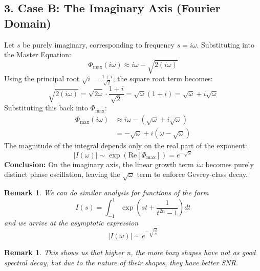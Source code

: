 \documentclass[11pt]{article}
\theoremstyle{breakdef}
\newtheorem{remark}[theorem]{Remark}
\begin{document}
\subsection*{3. Case B: The Imaginary Axis (Fourier Domain)}
Let $s$ be purely imaginary, corresponding to frequency $s = i\omega$. Substituting into the Master Equation:
\begin{equation}
    \Phi_{\text{max}}(i\omega) \approx i\omega - \sqrt{2(i\omega)}
\end{equation}
Using the principal root $\sqrt{i} = \frac{1+i}{\sqrt{2}}$, the square root term becomes:
\begin{equation}
    \sqrt{2(i\omega)} = \sqrt{2\omega} \cdot \frac{1+i}{\sqrt{2}} = \sqrt{\omega}(1+i) = \sqrt{\omega} + i\sqrt{\omega}
\end{equation}
Substituting this back into $\Phi_{\text{max}}$:
\begin{align}
    \Phi_{\text{max}}(i\omega) &\approx i\omega - \left( \sqrt{\omega} + i\sqrt{\omega} \right) \\
    &= -\sqrt{\omega} + i(\omega - \sqrt{\omega})
\end{align}
The magnitude of the integral depends only on the real part of the exponent:
\begin{equation}
    |I(\omega)| \sim \exp\left( \text{Re}[\Phi_{\text{max}}] \right) = e^{-\sqrt{\omega}}
\end{equation}
\textbf{Conclusion:} On the imaginary axis, the linear growth term $i\omega$ 
becomes purely distinct phase oscillation, leaving the $\sqrt{\omega}$ 
term to enforce Gevrey-class decay.

\begin{remark}
We can do similar analysis for functions of the form
\begin{equation}
    I(s) = \int_{-1}^{1} \exp\left( st + \frac{1}{t^{2n} - 1} \right) dt
\end{equation}
and we arrive at the asymptotic expression
\begin{equation}
|I(\omega)| \sim e^{-\sqrt{\frac{ \omega}{n}}}
\end{equation}

\end{remark}

\begin{remark}
This shows us that higher n, the more boxy shapes have not as good spectral decay, but due to the nature of their shapes, they have better SNR.
\end{remark}
\end{document}

